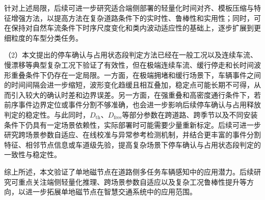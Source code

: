 \documentclass{xdupgthesis}
\begin{document}
针对上述局限，后续可进一步研究适合端侧部署的轻量化时间对齐、模板压缩与特征增强方法，以提高方法在复杂道路条件下的实时性、鲁棒性和实用性；同时，可在保持对自然车流条件下时序尺度变化和类内波动适应性的基础上，逐步扩展到更细粒度的车型分类任务。

（2）本文提出的停车确认与占用状态段判定方法已经在一般工况以及连续车流、慢漂移等典型复杂工况下验证了有效性，但在极端连续车流、缓行停走和长时间波形重叠条件下仍存在一定局限。一方面，在极端拥堵和缓行场景下，车辆事件之间的时间间隔会进一步缩短，波形变化趋缓且相互叠加，稳定点可能长期不可得，从而引入较大的确认时差和边界误差。另一方面，在强重叠和高密度通行条件下，若前序事件边界定位或事件分割不够准确，也会进一步影响后续停车确认与占用释放判定的稳定性。与此同时，$D_{\mathrm{th}}$、$D_{\mathrm{free}}$等部分参数在跨道路、跨季节以及不同安装条件下仍具有一定场景依赖性，实际部署时可能需要少量重新标定。后续可进一步研究跨场景参数自适应、在线校准与异常参考检测机制，并结合更丰富的事件分割特征、相邻节点信息或车道级先验，提高复杂场景下停车确认与占用状态段判定的一致性与稳定性。

综上所述，本文验证了单地磁节点在道路侧多任务车辆感知中的应用潜力。后续研究可重点关注端侧轻量化推理、跨场景参数自适应以及复杂工况鲁棒性提升等方向，以进一步拓展单地磁节点在智慧交通系统中的应用范围。
\end{document}
